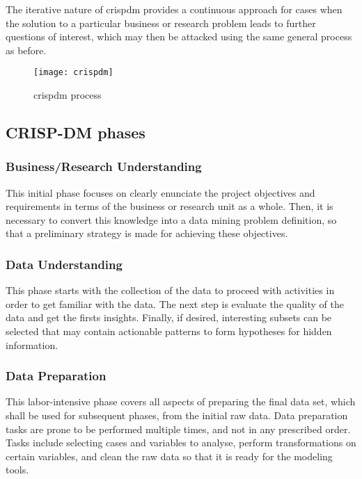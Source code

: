 The iterative nature of \Acrshort{crispdm} provides a continuous approach for cases when the solution to a particular business or research problem leads to further questions of interest, which may then be attacked using the same general process as before.


\begin{figure}[htbp]
	\centering
	\texttt{[image: crispdm]}
	\caption{\Acrshort{crispdm} process}
	\label{fig:crispdm}
\end{figure}

\subsection{CRISP-DM phases}
\label{subsec:crispdm_phases}

\subsubsection{Business/Research Understanding}
\label{subsubsec:business_understanding}

This initial phase focuses on clearly enunciate the project objectives and requirements in terms of the business or research unit as a whole. Then, it is necessary to convert this knowledge into a data mining problem definition, so that a preliminary strategy is made for achieving these objectives.

\subsubsection{Data Understanding}

This phase starts with the collection of the data to proceed with activities in order to get familiar with the data. The next step is evaluate the quality of the data and get the firsts insights. Finally, if desired, interesting subsets can be selected that may contain actionable patterns to form hypotheses for hidden information.

\subsubsection{Data Preparation}

This labor-intensive phase covers all aspects of preparing the final data set, which shall be used for subsequent phases, from the initial raw data. Data preparation tasks are prone to be performed multiple times, and not in any prescribed order. Tasks include selecting cases and variables to analyse, perform transformations on certain variables, and clean the raw data so that it is ready for the modeling tools.

